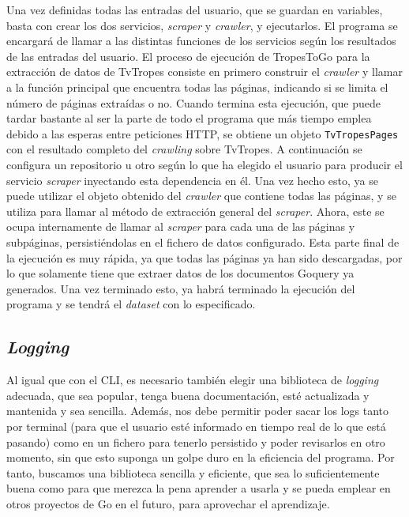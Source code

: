 Una vez definidas todas las entradas del usuario, que se guardan en variables,
basta con crear los dos servicios, \textit{scraper} y \textit{crawler}, y
ejecutarlos. El programa se encargará de llamar a las distintas funciones de los
servicios según los resultados de las entradas del usuario. El proceso de
ejecución de TropesToGo para la extracción de datos de TvTropes consiste en
primero construir el \textit{crawler} y llamar a la función principal que encuentra
todas las páginas, indicando si se limita el número de páginas extraídas o no.
Cuando termina esta ejecución, que puede tardar bastante al ser la parte de todo
el programa que más tiempo emplea debido a las esperas entre peticiones HTTP, se
obtiene un objeto \texttt{TvTropesPages} con el resultado completo del \textit{crawling}
sobre TvTropes. A continuación se configura un repositorio u otro según lo que
ha elegido el usuario para producir el servicio \textit{scraper} inyectando esta
dependencia en él. Una vez hecho esto, ya se puede utilizar el objeto obtenido
del \textit{crawler} que contiene todas las páginas, y se utiliza para llamar al
método de extracción general del \textit{scraper}. Ahora, este se ocupa
internamente de llamar al \textit{scraper} para cada una de las páginas y
subpáginas, persistiéndolas en el fichero de datos configurado. Esta parte final
de la ejecución es muy rápida, ya que todas las páginas ya han sido descargadas,
por lo que solamente tiene que extraer datos de los documentos Goquery ya
generados. Una vez terminado esto, ya habrá terminado la ejecución del programa
y se tendrá el \textit{dataset} con lo especificado.

\subsection{\textit{Logging}}
Al igual que con el CLI, es necesario también elegir una biblioteca de
\textit{logging} adecuada, que sea popular, tenga buena documentación, esté
actualizada y mantenida y sea sencilla. Además, nos debe permitir
poder sacar los logs tanto por terminal (para que el usuario esté informado en
tiempo real de lo que está pasando) como en un fichero para tenerlo persistido y
poder revisarlos en otro momento, sin que esto suponga un golpe duro en la
eficiencia del programa. Por tanto, buscamos una biblioteca sencilla y
eficiente, que sea lo suficientemente buena como para que merezca la pena
aprender a usarla y se pueda emplear en otros proyectos de Go en el futuro, para
aprovechar el aprendizaje.

